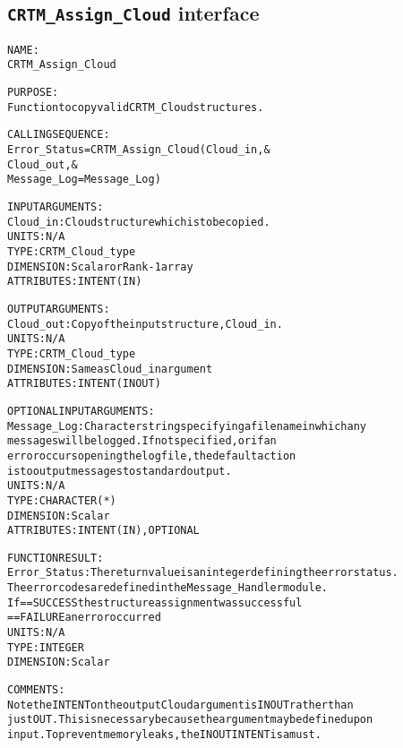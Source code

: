 \subsection{\texttt{CRTM\_Assign\_Cloud} interface}
  \label{sec:CRTM_Assign_Cloud_interface}
  \begin{alltt}
 
  NAME:
        CRTM_Assign_Cloud
 
  PURPOSE:
        Function to copy valid CRTM_Cloud structures.
 
  CALLING SEQUENCE:
        Error_Status = CRTM_Assign_Cloud( Cloud_in               , &
                                          Cloud_out              , &
                                          Message_Log=Message_Log  )
 
  INPUT ARGUMENTS:
        Cloud_in:      Cloud structure which is to be copied.
                       UNITS:      N/A
                       TYPE:       CRTM_Cloud_type
                       DIMENSION:  Scalar or Rank-1 array
                       ATTRIBUTES: INTENT(IN)
 
  OUTPUT ARGUMENTS:
        Cloud_out:     Copy of the input structure, Cloud_in.
                       UNITS:      N/A
                       TYPE:       CRTM_Cloud_type
                       DIMENSION:  Same as Cloud_in argument
                       ATTRIBUTES: INTENT(IN OUT)
 
  OPTIONAL INPUT ARGUMENTS:
        Message_Log:   Character string specifying a filename in which any
                       messages will be logged. If not specified, or if an
                       error occurs opening the log file, the default action
                       is to output messages to standard output.
                       UNITS:      N/A
                       TYPE:       CHARACTER(*)
                       DIMENSION:  Scalar
                       ATTRIBUTES: INTENT(IN), OPTIONAL
 
  FUNCTION RESULT:
        Error_Status:  The return value is an integer defining the error status.
                       The error codes are defined in the Message_Handler module.
                       If == SUCCESS the structure assignment was successful
                          == FAILURE an error occurred
                       UNITS:      N/A
                       TYPE:       INTEGER
                       DIMENSION:  Scalar
 
  COMMENTS:
        Note the INTENT on the output Cloud argument is IN OUT rather than
        just OUT. This is necessary because the argument may be defined upon
        input. To prevent memory leaks, the IN OUT INTENT is a must.
 
  \end{alltt}

